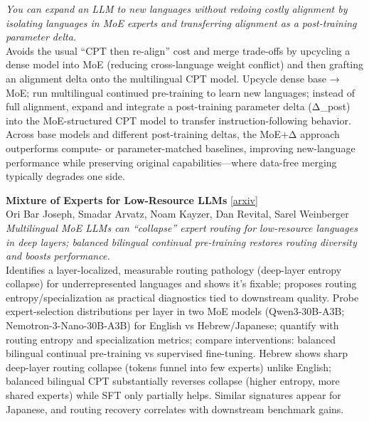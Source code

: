 \documentclass[12pt,letterpaper]{article}
\begin{document}
{\small\textit{You can expand an LLM to new languages without redoing costly alignment by isolating languages in MoE experts and transferring alignment as a post-training parameter delta.}}\\[1pt]
{\footnotesize Avoids the usual ``CPT then re-align'' cost and merge trade-offs by upcycling a dense model into MoE (reducing cross-language weight conflict) and then grafting an alignment delta onto the multilingual CPT model. Upcycle dense base → MoE; run multilingual continued pre-training to learn new languages; instead of full alignment, expand and integrate a post-training parameter delta (Δ\_post) into the MoE-structured CPT model to transfer instruction-following behavior. Across base models and different post-training deltas, the MoE+Δ approach outperforms compute- or parameter-matched baselines, improving new-language performance while preserving original capabilities---where data-free merging typically degrades one side.}

\medskip

{\small\textbf{Mixture of Experts for Low-Resource LLMs}} {\scriptsize[\href{https://arxiv.org/abs/2605.17598}{arxiv}]}\\
{\scriptsize Ori Bar Joseph, Smadar Arvatz, Noam Kayzer, Dan Revital, Sarel Weinberger}\\

{\small\textit{Multilingual MoE LLMs can ``collapse'' expert routing for low-resource languages in deep layers; balanced bilingual continual pre-training restores routing diversity and boosts performance.}}\\[1pt]
{\footnotesize Identifies a layer-localized, measurable routing pathology (deep-layer entropy collapse) for underrepresented languages and shows it's fixable; proposes routing entropy/specialization as practical diagnostics tied to downstream quality. Probe expert-selection distributions per layer in two MoE models (Qwen3-30B-A3B; Nemotron-3-Nano-30B-A3B) for English vs Hebrew/Japanese; quantify with routing entropy and specialization metrics; compare interventions: balanced bilingual continual pre-training vs supervised fine-tuning. Hebrew shows sharp deep-layer routing collapse (tokens funnel into few experts) unlike English; balanced bilingual CPT substantially reverses collapse (higher entropy, more shared experts) while SFT only partially helps. Similar signatures appear for Japanese, and routing recovery correlates with downstream benchmark gains.}

\medskip
\end{document}
